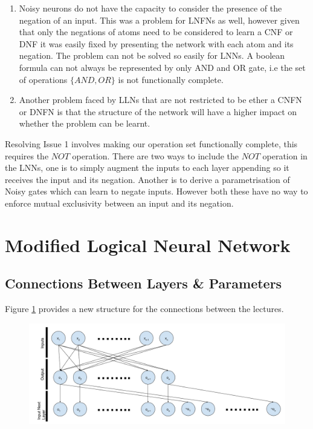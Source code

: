 \begin{enumerate}
	\item Noisy neurons do not have the capacity to consider the presence of the negation of an input. This was a problem for LNFNs as well, however given that only the negations of atoms need to be considered to learn a CNF or DNF it was easily fixed by presenting the network with each atom and its negation. The problem can not be solved so easily for LNNs. A boolean formula can not always be represented by only AND and OR gate, i.e the set of operations $\{AND, OR\}$ is not functionally complete. 
	
	\item Another problem faced by LLNs that are not restricted to be ether a CNFN or DNFN is that the structure of the network will have a higher impact on whether the problem can be learnt. 
\end{enumerate}

Resolving Issue 1 involves making our operation set functionally complete, this requires the $NOT$ operation. There are two ways to include the $NOT$ operation in the LNNs, one is to simply augment the inputs to each layer appending so it receives the input and its negation. Another is to derive a parametrisation of Noisy gates which can learn to negate inputs. However both these have no way to enforce mutual exclusivity between an input and its negation.\\

\section{Modified Logical Neural Network} \label{sec:modified-lnn}
\subsection{Connections Between Layers \& Parameters}
Figure \ref{fig:modified-lnn-structure} provides a new structure for the connections between the lectures.

\begin{figure}[H]
	\centering
	\begin{minipage}[b]{0.9\textwidth}
		\includegraphics[width=\textwidth]{Modified-LNN-Structure.png}
		\caption{}
		\label{fig:modified-lnn-structure}
	\end{minipage}
	\hfill
\end{figure}


